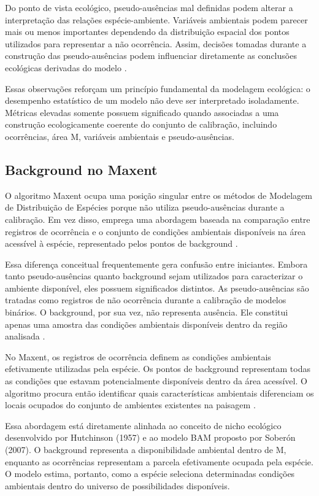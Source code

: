 Do ponto de vista ecológico, pseudo-ausências mal definidas podem alterar a interpretação das relações espécie-ambiente. Variáveis ambientais podem parecer mais ou menos importantes dependendo da distribuição espacial dos pontos utilizados para representar a não ocorrência. Assim, decisões tomadas durante a construção das pseudo-ausências podem influenciar diretamente as conclusões ecológicas derivadas do modelo \citep{franklin2010mapping}.

Essas observações reforçam um princípio fundamental da modelagem ecológica: o desempenho estatístico de um modelo não deve ser interpretado isoladamente. Métricas elevadas somente possuem significado quando associadas a uma construção ecologicamente coerente do conjunto de calibração, incluindo ocorrências, área M, variáveis ambientais e pseudo-ausências.

\subsection{Background no Maxent}

O algoritmo Maxent ocupa uma posição singular entre os métodos de Modelagem de Distribuição de Espécies porque não utiliza pseudo-ausências durante a calibração. Em vez disso, emprega uma abordagem baseada na comparação entre registros de ocorrência e o conjunto de condições ambientais disponíveis na área acessível à espécie, representado pelos pontos de background \citep{phillips2006maximum}.

Essa diferença conceitual frequentemente gera confusão entre iniciantes. Embora tanto pseudo-ausências quanto background sejam utilizados para caracterizar o ambiente disponível, eles possuem significados distintos. As pseudo-ausências são tratadas como registros de não ocorrência durante a calibração de modelos binários. O background, por sua vez, não representa ausência. Ele constitui apenas uma amostra das condições ambientais disponíveis dentro da região analisada \citep{phillips2009sample}.

No Maxent, os registros de ocorrência definem as condições ambientais efetivamente utilizadas pela espécie. Os pontos de background representam todas as condições que estavam potencialmente disponíveis dentro da área acessível. O algoritmo procura então identificar quais características ambientais diferenciam os locais ocupados do conjunto de ambientes existentes na paisagem \citep{elith2011statistical}.

Essa abordagem está diretamente alinhada ao conceito de nicho ecológico desenvolvido por Hutchinson (1957) e ao modelo BAM proposto por Soberón (2007). O background representa a disponibilidade ambiental dentro de M, enquanto as ocorrências representam a parcela efetivamente ocupada pela espécie. O modelo estima, portanto, como a espécie seleciona determinadas condições ambientais dentro do universo de possibilidades disponíveis.

